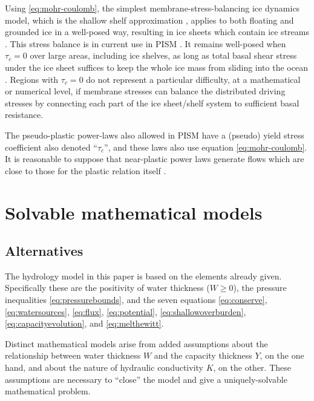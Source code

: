 \documentclass[11pt]{amsart}
\begin{document}
Using \eqref{eq:mohr-coulomb}, the simplest membrane-stress-balancing ice dynamics model, which is the shallow shelf approximation \citep{WeisGreveHutter}, applies to both floating and grounded ice in a well-posed way, resulting in ice sheets which contain ice streams  \citep{SchoofStream}.  This stress balance is in current use in PISM \citep{BBssasliding}.  It remains well-posed when $\tau_c=0$ over large areas, including ice shelves, as long as total basal shear stress under the ice sheet suffices to keep the whole ice mass from sliding into the ocean \citep{SchoofStream}.  Regions with $\tau_c=0$ do not represent a particular difficulty, at a mathematical or numerical level, if membrane stresses can balance the distributed driving stresses by connecting each part of the ice sheet/shelf system to sufficient basal resistance.

The pseudo-plastic power-laws also allowed in PISM \citep{pism-user-manual} have a (pseudo) yield stress coefficient also denoted ``$\tau_c$'', and these laws also use equation \eqref{eq:mohr-coulomb}.  It is reasonable to suppose that near-plastic power laws generate flows which are close to those for the plastic relation itself \citep{SchoofCoulombBlatter}.


\section{Solvable mathematical models}

\subsection*{Alternatives} The hydrology model in this paper is based on the elements already given.  Specifically these are the positivity of water thickness ($W\ge 0$), the pressure inequalities \eqref{eq:pressurebounds}, and the seven equations \eqref{eq:conserve}, \eqref{eq:watersources}, \eqref{eq:flux}, \eqref{eq:potential}, \eqref{eq:shallowoverburden}, \eqref{eq:capacityevolution}, and \eqref{eq:melthewitt}.

Distinct mathematical models arise from added assumptions about the relationship between water thickness $W$ and the capacity thickness $Y$, on the one hand, and about the nature of hydraulic conductivity $K$, on the other.  These assumptions are necessary to ``close'' the model and give a uniquely-solvable mathematical problem.
\end{document}
